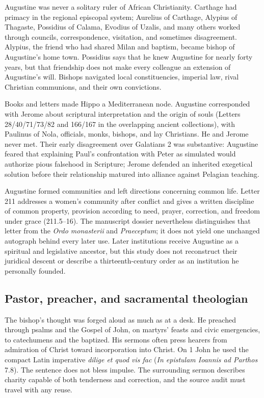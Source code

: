 Augustine was never a solitary ruler of African Christianity. Carthage had
primacy in the regional episcopal system; Aurelius of Carthage, Alypius of
Thagaste, Possidius of Calama, Evodius of Uzalis, and many others worked through
councils, correspondence, visitation, and sometimes disagreement. Alypius, the
friend who had shared Milan and baptism, became bishop of Augustine's home
town. Possidius says that he knew Augustine for nearly forty years, but that
friendship does not make every colleague an extension of Augustine's will.
Bishops navigated local constituencies, imperial law, rival
Christian communions, and their own convictions.

Books and letters made Hippo a Mediterranean node. Augustine corresponded with
Jerome about scriptural interpretation and the origin of souls (Letters
28/40/71/73/82 and 166/167 in the overlapping ancient collections), with
Paulinus of Nola, officials, monks, bishops, and lay Christians. He and Jerome
never met. Their early disagreement over Galatians 2 was substantive:
Augustine feared that explaining Paul's confrontation with Peter as simulated
would authorize pious falsehood in Scripture; Jerome defended an inherited
exegetical solution before their relationship matured into alliance against
Pelagian teaching.

Augustine formed communities and left directions concerning common life.
Letter 211 addresses a women's community after conflict and gives a written
discipline of common property, provision according to need, prayer, correction,
and freedom under grace (211.5--16). The manuscript dossier nevertheless
distinguishes that letter from the \emph{Ordo monasterii} and
\emph{Praeceptum}; it does not yield one unchanged autograph behind every later
use. Later institutions receive Augustine as a spiritual and legislative
ancestor, but this study does not reconstruct their juridical descent or
describe a thirteenth-century order as an institution he personally founded.

\subsection{Pastor, preacher, and sacramental theologian}

The bishop's thought was forged aloud as much as at a desk. He preached through
psalms and the Gospel of John, on martyrs' feasts and civic emergencies, to
catechumens and the baptized. His sermons often press hearers from admiration
of Christ toward incorporation into Christ. On 1 John he used the compact
Latin imperative \emph{dilige et quod vis fac} (\emph{In epistulam Ioannis ad
Parthos} 7.8). The sentence does not bless impulse. The surrounding sermon
describes charity capable of both tenderness and correction, and the source audit must travel
with any reuse.

